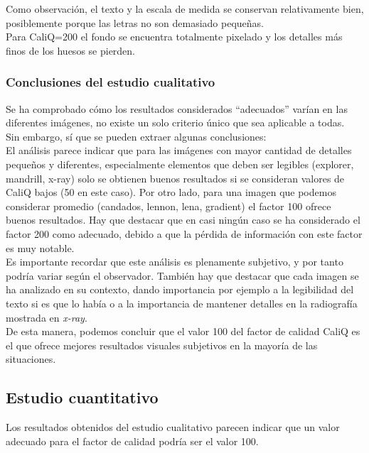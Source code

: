 \documentclass[12pt,a4paper]{article}
\begin{document}
Como observación, el texto y la escala de medida se conservan relativamente bien, posiblemente porque las letras no son demasiado pequeñas.\\

Para CaliQ=200 el fondo se encuentra totalmente pixelado y los detalles más finos de los huesos se pierden.


\subsubsection{Conclusiones del estudio cualitativo}

Se ha comprobado cómo los resultados considerados ``adecuados'' varían en las diferentes imágenes, no existe un solo criterio único que sea aplicable a todas.\\

Sin embargo, sí que se pueden extraer algunas conclusiones:\\

El análisis parece indicar que para las imágenes con mayor cantidad de detalles pequeños y diferentes, especialmente elementos que deben ser legibles (explorer, mandrill, x-ray) solo se obtienen buenos resultados si se consideran valores de CaliQ bajos (50 en este caso). Por otro lado, para una imagen que podemos considerar promedio (candados, lennon, lena, gradient) el factor 100 ofrece buenos resultados. Hay que destacar que en casi ningún caso se ha considerado el factor 200 como adecuado, debido a que la pérdida de información con este factor es muy notable.\\

Es importante recordar que este análisis es plenamente subjetivo, y por tanto podría variar según el observador. También hay que destacar que cada imagen se ha analizado en su contexto, dando importancia por ejemplo a la legibilidad del texto si es que lo había o a la importancia de mantener detalles en la radiografía mostrada en \textit{x-ray}.\\

De esta manera, podemos concluir que el valor 100 del factor de calidad CaliQ es el que ofrece mejores resultados visuales subjetivos en la mayoría de las situaciones.\\

\newpage
\subsection{Estudio cuantitativo}
Los resultados obtenidos del estudio cualitativo parecen indicar que un valor adecuado para el factor de calidad podría ser el valor 100.\\
\end{document}

